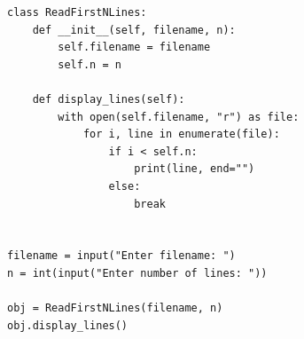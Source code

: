 \begin{verbatim}
class ReadFirstNLines:
    def __init__(self, filename, n):
        self.filename = filename
        self.n = n

    def display_lines(self):
        with open(self.filename, "r") as file:
            for i, line in enumerate(file):
                if i < self.n:
                    print(line, end="")
                else:
                    break


filename = input("Enter filename: ")
n = int(input("Enter number of lines: "))

obj = ReadFirstNLines(filename, n)
obj.display_lines()
\end{verbatim}